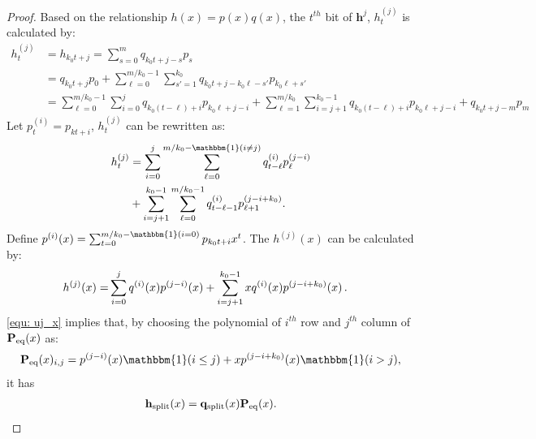 \documentclass [PhD] {uclathes}
\begin{document}
\begin{proof}
Based on the relationship $h(x)=p(x)q(x)$, the $t^{th}$ bit of $\mathbf{h}^{j}$, $h^{(j)}_t$ is calculated by:
\begin{align}
    h_t^{(j)}
    &= h_{k_0t+j} = \sum_{s=0}^m q_{k_0t+j-s}p_s\\
    &= q_{k_0t+j}p_0+ \sum_{\ell = 0}^{ m/k_0  - 1} \sum_{s'=1}^{k_0} q_{k_0t+j-k_0\ell-s'} p_{k_0\ell+s'}\\
    &= \sum_{\ell = 0}^{ m/k_0  - 1} \sum_{i=0}^j q_{k_0(t-\ell)+i} p_{k_0\ell+j-i}+\sum_{\ell = 1}^{ m/k_0}\sum_{i=j+1}^{k_0-1} q_{k_0(t-\ell)+i} p_{k_0\ell+j-i}+q_{k_0t+j-m}p_m
\end{align}
Let $p^{(i)}_t = p_{kt+i}$, $h^{(j)}_t$ can be rewritten as:
\begin{align}
    h_t^{(j)} &= \sum_{i=0}^j \sum_{\ell = 0}^{ m/k_0  - \mathbbm{1}(i\neq j)} \crcquotel^{(i)}_{t-\ell} p^{(j-i)}_{\ell} \nonumber \\&+ \sum_{i=j+1}^{k_0-1} \sum_{\ell = 0}^{ m/k_0  - 1} \crcquotel^{(i)}_{t-\ell-1} p^{(j-i+k_0)}_{\ell+1}.
\end{align}
Define $p^{(i)}(x)=\sum_{t=0}^{m/\ccinnum-\mathbbm{1}(i=0)}p_{\ccinnum t+i}x^{t}$. The $h^{(j)}(x)$ can be calculated by: 
\begin{align}\label{equ: uj_x}
    h^{(j)}(x) =& \sum_{i=0}^j q^{(i)}(x)p^{(j-i)}(x)+ \sum_{i=j+1}^{k_0  -1} xq^{(i)}(x) p^{(j-i+k_0)}(x)\,.
\end{align}
\eqref{equ: uj_x} implies that, by choosing the polynomial of $i^{th}$ row and $j^{th}$ column of $\mathbf{P}_{\mathrm{eq}}(x)$ as:
\begin{align}\label{equ: peq2}
\peq(x)_{i,j} = p^{(j-i)}(x)\mathbbm{1}(i\leq j)+xp^{(j-i+\ccinnum)}(x)\mathbbm{1}(i > j),
\end{align}
it has 
\begin{align}
\mathbf{h}_{\mathrm{split}}(x) = \mathbf{q}_{\mathrm{split}}(x) \mathbf{P}_{\mathrm{eq}}(x).
\end{align}
\end{proof}
\end{document}
